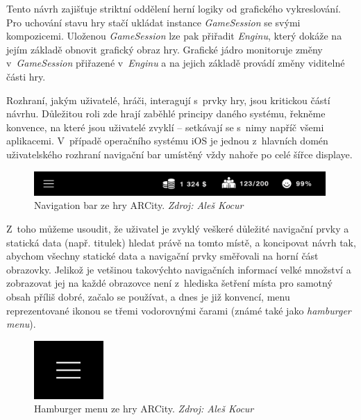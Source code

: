 \documentclass[twoside,12pt]{article}
\begin{document}
Tento návrh zajišťuje striktní oddělení herní logiky od grafického vykreslování. Pro uchování stavu hry stačí ukládat instance \textit{GameSession} se svými kompozicemi. Uloženou \textit{GameSession} lze pak přiřadit \textit{Enginu}, který dokáže na jejím základě obnovit grafický obraz hry. Grafické jádro monitoruje změny v~\textit{GameSession} přiřazené v~\textit{Enginu} a na jejich základě provádí změny viditelné části hry. 


Rozhraní, jakým uživatelé, hráči, interagují s~prvky hry, jsou kritickou částí návrhu. Důležitou roli zde hrají zaběhlé principy daného systému, řekněme konvence, na které jsou uživatelé zvyklí -- setkávají se s~nimy napříč všemi aplikacemi. V~případě operačního systému iOS je jednou z~hlavních domén uživatelského rozhraní navigační bar umístěný vždy nahoře po celé šířce displaye.    

\begin{figure}[H]
\centering
    \includegraphics[width=420px, center]{images/nav_bar_iphone.png}
\captionsetup{justification=centering}
    \caption[]{Navigation bar ze hry ARCity. \textit{Zdroj: Aleš Kocur}}
    \label{navigation_bar}
\end{figure}

Z~toho můžeme usoudit, že uživatel je zvyklý veškeré důležité navigační prvky a statická data (např. titulek) hledat právě na tomto místě, a koncipovat návrh tak, abychom všechny statické data a navigační prvky směřovali na horní část obrazovky. Jelikož je vetšinou takovýchto navigačních informací velké množství a zobrazovat jej na každé obrazovce není z~hlediska šetření místa pro samotný obsah příliš dobré, začalo se používat, a dnes je již konvencí, menu reprezentované ikonou se třemi vodorovnými čarami (známé také jako \textit{hamburger menu}). 

\begin{figure}[H]
\centering
    \includegraphics[width=100px, center]{images/hamburger_menu.png}
\captionsetup{justification=centering}
    \caption[]{Hamburger menu ze hry ARCity. \textit{Zdroj: Aleš Kocur}}
    \label{hamburger-menu}
\end{figure}
\end{document}

